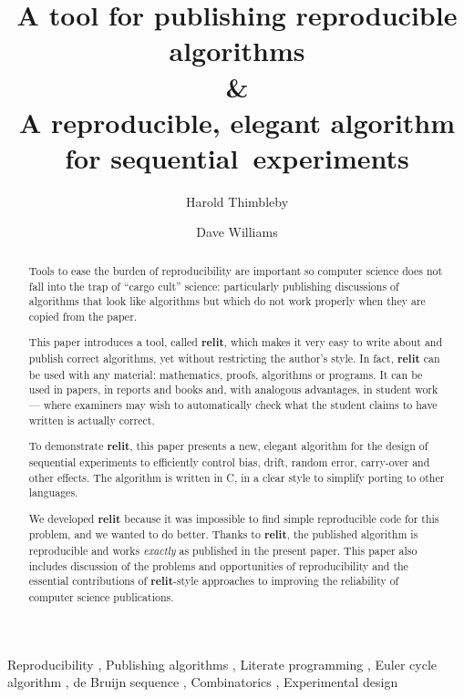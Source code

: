 \documentclass[preprint,times]{elsarticle}
\def\name#1{\textbf{#1}}
\begin{document}
\title{A tool for publishing reproducible algorithms\\
\&\\
A reproducible, elegant algorithm for sequential~experiments
}

\author[swansea]{Harold Thimbleby}

\author[swansea]{Dave Williams}

\address[swansea]{Swansea University, Wales, SA2 8PP}

\begin{abstract}
Tools to ease the burden of reproducibility are important so computer science does not fall into the trap of ``cargo cult'' science: particularly publishing discussions of algorithms that look like algorithms but which do not work properly when they are copied from the paper. 

This paper introduces a tool, called \name{relit}, which makes it very easy to write about and publish correct algorithms, yet without restricting the author's style. In fact, \name{relit} can be used with any material: mathematics, proofs, algorithms or programs. It can be used in papers, in reports and books and, with analogous advantages, in student work --- where examiners may wish to automatically check what the student claims to have written is actually correct.

To demonstrate \name{relit}, this paper presents a new, elegant algorithm for the design of sequential experiments to efficiently control bias, drift, random error, carry-over and other effects. The algorithm is written in C, in a clear style to simplify porting to other languages.  

We developed \name{relit} because it was impossible to find simple reproducible code for this problem, and we wanted to do better. Thanks to \name{relit}, the published algorithm is reproducible and works \emph{exactly\/} as published in the present paper. This paper also includes discussion of the problems and opportunities of reproducibility and the essential contributions of \name{relit}-style approaches to improving the reliability of computer science publications.
\end{abstract}

\begin{keyword}
Reproducibility \sep
Publishing algorithms \sep
Literate programming \sep
Euler cycle algorithm \sep
de Bruijn sequence \sep
Combinatorics \sep
Experimental design
\end{keyword}
\end{document}
